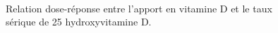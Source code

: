 \documentclass[
  a4paper,
  DIV=11,
  numbers=noendperiod,
  listof=totoc]{scrreprt}
\begin{document}
\begin{figure}

\begin{minipage}[t]{0.39\linewidth}

{\centering 


\caption{\label{fig-vd-pk-estim}Relation dose-réponse entre l'apport en
vitamine D et le taux sérique de 25 hydroxyvitamine D.
\textcite{Veugelers.2014}}

}

\end{minipage}%
%
\begin{minipage}[t]{0.03\linewidth}

{\centering 

~

}

\end{minipage}%
%
\begin{minipage}[t]{0.58\linewidth}

{\centering 

\raisebox{-\height}{

}}
\end{minipage}
\end{figure}
\end{document}
